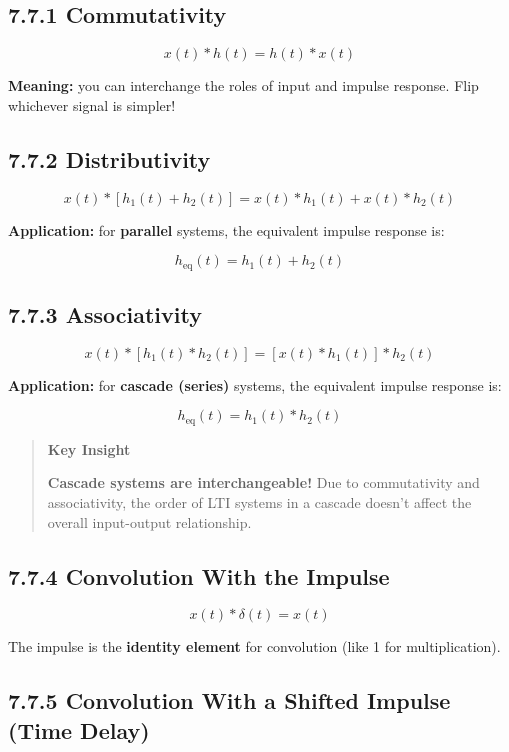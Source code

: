 \documentclass[11pt]{article}
\begin{document}
\subsection*{7.7.1 Commutativity}

\[\boxed{\;x(t)*h(t) = h(t)*x(t)\;}\]

\textbf{Meaning:} you can interchange the roles of input and impulse response. Flip whichever signal is simpler!

\subsection*{7.7.2 Distributivity}

\[\boxed{\;x(t)*[h_1(t) + h_2(t)] = x(t)*h_1(t) + x(t)*h_2(t)\;}\]

\textbf{Application:} for \textbf{parallel} systems, the equivalent impulse response is:

\[h_{\text{eq}}(t) = h_1(t) + h_2(t)\]

\subsection*{7.7.3 Associativity}

\[\boxed{\;x(t)*[h_1(t)*h_2(t)] = [x(t)*h_1(t)]*h_2(t)\;}\]

\textbf{Application:} for \textbf{cascade (series)} systems, the equivalent impulse response is:

\[h_{\text{eq}}(t) = h_1(t)*h_2(t)\]

\begin{quote}
\textbf{Key Insight}

\textbf{Cascade systems are interchangeable!} Due to commutativity and associativity, the order of LTI systems in a cascade doesn't affect the overall input-output relationship.
\end{quote}

\subsection*{7.7.4 Convolution With the Impulse}

\[x(t)*\delta(t) = x(t)\]

The impulse is the \textbf{identity element} for convolution (like 1 for multiplication).

\subsection*{7.7.5 Convolution With a Shifted Impulse (Time Delay)}
\end{document}
